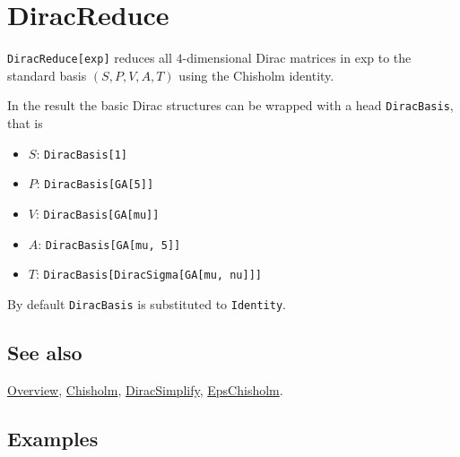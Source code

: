 \documentclass[../FeynCalcManual.tex]{subfiles}
\begin{document}
\hypertarget{diracreduce}{
\section{DiracReduce}\label{diracreduce}}

\texttt{DiracReduce[\allowbreak{}exp]} reduces all \(4\)-dimensional
Dirac matrices in exp to the standard basis \((S, P, V, A, T)\) using
the Chisholm identity.

In the result the basic Dirac structures can be wrapped with a head
\texttt{DiracBasis}, that is

\begin{itemize}
\tightlist
\item
  \(S\): \texttt{DiracBasis[\allowbreak{}1]}
\item
  \(P\): \texttt{DiracBasis[\allowbreak{}GA[\allowbreak{}5]]}
\item
  \(V\): \texttt{DiracBasis[\allowbreak{}GA[\allowbreak{}mu]]}
\item
  \(A\):
  \texttt{DiracBasis[\allowbreak{}GA[\allowbreak{}mu,\ \allowbreak{}5]]}
\item
  \(T\):
  \texttt{DiracBasis[\allowbreak{}DiracSigma[\allowbreak{}GA[\allowbreak{}mu,\ \allowbreak{}nu]]]}
\end{itemize}

By default \texttt{DiracBasis} is substituted to \texttt{Identity}.

\subsection{See also}

\hyperlink{toc}{Overview}, \hyperlink{chisholm}{Chisholm},
\hyperlink{diracsimplify}{DiracSimplify},
\hyperlink{epschisholm}{EpsChisholm}.

\subsection{Examples}

\begin{Shaded}
\begin{Highlighting}[]
\OperatorTok{[}\SpecialCharTok{\textbackslash{}}\OperatorTok{[}\OperatorTok{],} \SpecialCharTok{\textbackslash{}}\OperatorTok{[}\OperatorTok{]]} 
 
\OperatorTok{[}\SpecialCharTok{\%}\OperatorTok{]}
\end{Highlighting}
\end{Shaded}
\end{document}

